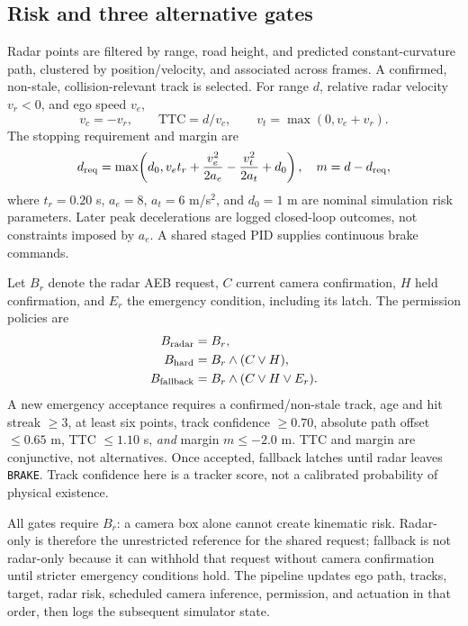 \documentclass[conference]{IEEEtran}
\begin{document}
\subsection{Risk and three alternative gates}
Radar points are filtered by range, road height, and predicted constant-curvature
path, clustered by position/velocity, and associated across frames. A confirmed,
non-stale, collision-relevant track is selected. For range $d$, relative radar
velocity $v_r<0$, and ego speed $v_e$,
\begin{equation}
v_c=-v_r,\qquad \mathrm{TTC}=d/v_c,\qquad v_t=\max(0,v_e+v_r).
\end{equation}
The stopping requirement and margin are
\begin{equation}
d_{\rm req}=\max\!\left(d_0,v_et_r+\frac{v_e^2}{2a_e}-\frac{v_t^2}{2a_t}+d_0\right),
\quad m=d-d_{\rm req},
\end{equation}
where $t_r=0.20$ s, $a_e=8$, $a_t=6$ m/s$^2$, and $d_0=1$ m are nominal
simulation risk parameters. Later peak decelerations are logged closed-loop
outcomes, not constraints imposed by $a_e$. A shared staged PID supplies
continuous brake commands.

Let $B_r$ denote the radar AEB request, $C$ current camera confirmation, $H$
held confirmation, and $E_r$ the emergency condition, including its latch. The
permission policies are
\begin{align}
 B_{\rm radar}&=B_r,\\
 B_{\rm hard}&=B_r\land(C\lor H),\\
 B_{\rm fallback}&=B_r\land(C\lor H\lor E_r).
\end{align}
A new emergency acceptance requires a confirmed/non-stale track, age and hit
streak $\geq3$, at least six points, track confidence $\geq0.70$, absolute path
offset $\leq0.65$ m, TTC $\leq1.10$ s, \emph{and} margin $m\leq-2.0$ m.
TTC and margin are conjunctive, not alternatives. Once accepted, fallback
latches until radar leaves \texttt{BRAKE}. Track confidence here is a tracker
score, not a calibrated probability of physical existence.

All gates require $B_r$: a camera box alone cannot create kinematic risk.
Radar-only is therefore the unrestricted reference for the shared request;
fallback is not radar-only because it can withhold that request without camera
confirmation until stricter emergency conditions hold. The pipeline updates
ego path, tracks, target, radar risk, scheduled camera inference, permission,
and actuation in that order, then logs the subsequent simulator state.
\end{document}
